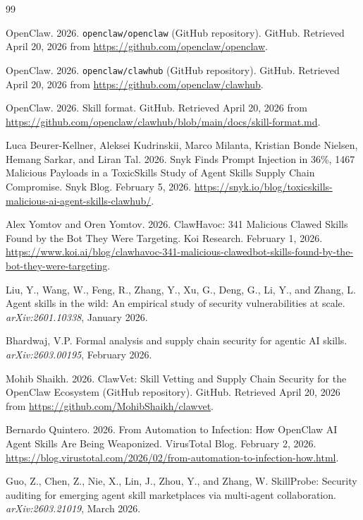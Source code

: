 \documentclass[sigconf,nonacm]{acmart}
\begin{document}

\begin{thebibliography}{99}

OpenClaw. 2026. \texttt{openclaw/openclaw} (GitHub repository). GitHub. Retrieved April 20, 2026 from \url{https://github.com/openclaw/openclaw}.

OpenClaw. 2026. \texttt{openclaw/clawhub} (GitHub repository). GitHub. Retrieved April 20, 2026 from \url{https://github.com/openclaw/clawhub}.

OpenClaw. 2026. Skill format. GitHub. Retrieved April 20, 2026 from \url{https://github.com/openclaw/clawhub/blob/main/docs/skill-format.md}.

Luca Beurer-Kellner, Aleksei Kudrinskii, Marco Milanta, Kristian Bonde Nielsen, Hemang Sarkar, and Liran Tal. 2026. Snyk Finds Prompt Injection in 36\%, 1467 Malicious Payloads in a ToxicSkills Study of Agent Skills Supply Chain Compromise. Snyk Blog. February 5, 2026. \url{https://snyk.io/blog/toxicskills-malicious-ai-agent-skills-clawhub/}.

Alex Yomtov and Oren Yomtov. 2026. ClawHavoc: 341 Malicious Clawed Skills Found by the Bot They Were Targeting. Koi Research. February 1, 2026. \url{https://www.koi.ai/blog/clawhavoc-341-malicious-clawedbot-skills-found-by-the-bot-they-were-targeting}.

Liu, Y., Wang, W., Feng, R., Zhang, Y., Xu, G., Deng, G., Li, Y., and Zhang, L. Agent skills in the wild: An empirical study of security vulnerabilities at scale. \textit{arXiv:2601.10338}, January 2026.

Bhardwaj, V.P. Formal analysis and supply chain security for agentic AI skills. \textit{arXiv:2603.00195}, February 2026.

Mohib Shaikh. 2026. ClawVet: Skill Vetting and Supply Chain Security for the OpenClaw Ecosystem (GitHub repository). GitHub. Retrieved April 20, 2026 from \url{https://github.com/MohibShaikh/clawvet}.

Bernardo Quintero. 2026. From Automation to Infection: How OpenClaw AI Agent Skills Are Being Weaponized. VirusTotal Blog. February 2, 2026. \url{https://blog.virustotal.com/2026/02/from-automation-to-infection-how.html}.

Guo, Z., Chen, Z., Nie, X., Lin, J., Zhou, Y., and Zhang, W. SkillProbe: Security auditing for emerging agent skill marketplaces via multi-agent collaboration. \textit{arXiv:2603.21019}, March 2026.


\end{thebibliography}
\end{document}

